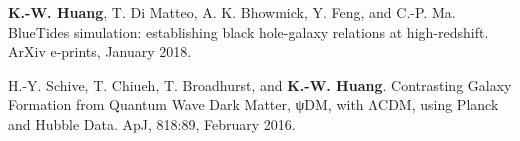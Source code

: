 





\begin{cvskills}


\cvskill
{\quad [2]} %
{\textbf{K.-W. Huang}, T. Di Matteo, A. K. Bhowmick, Y. Feng, and C.-P. Ma. BlueTides simulation: establishing black hole-galaxy relations at high-redshift. ArXiv e-prints, January 2018.}


\cvskill
{\quad [1]} %
{H.-Y. Schive, T. Chiueh, T. Broadhurst, and \textbf{K.-W. Huang}. Contrasting Galaxy Formation from Quantum Wave Dark Matter, ψDM, with ΛCDM, using Planck and Hubble Data. ApJ, 818:89, February 2016.}


\end{cvskills}
